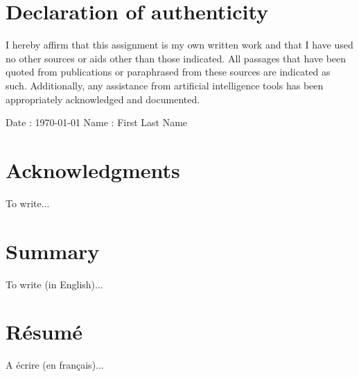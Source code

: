 \documentclass[a4paper,11pt,oneside]{book}
\newcommand{\TMauthorData}{First Last Name}
\newcommand{\DateData}{\today}
\begin{document}
\frontmatter

\pagestyle{empty}
\TMmaketitle

\pagestyle{mainstyle}

\tableofcontents
\clearpage

\chapter{Declaration of authenticity}
I hereby affirm that this assignment is my own written work and that I have used no other sources or aids other than those indicated. All passages that have been quoted from publications or paraphrased from these sources are indicated as such. Additionally, any assistance from artificial intelligence tools has been appropriately acknowledged and documented.
\vspace{1cm}

\begin{flushright}
    \begin{minipage}{7cm}
        Date : {\DateData}
        Name : {\TMauthorData}
    \end{minipage}
\end{flushright}


\chapter{Acknowledgments}
To write...


\chapter{Summary}
To write (in English)...


\chapter{Résumé}
A écrire (en français)...


\mainmatter
\fullchaptermarktrue %






\end{document}
